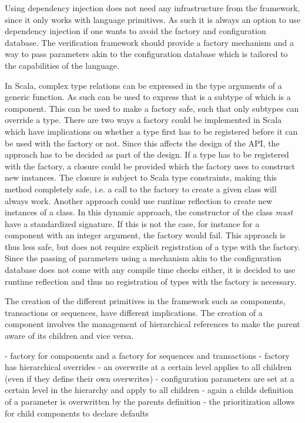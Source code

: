 Using dependency injection does not need any infrastructure from the framework, since it only works with language
primitives. As such it is always an option to use dependency injection if one wants to avoid the factory and
configuration database. The verification framework should provide a factory mechanism and a way to pass parameters
akin to the configuration database which is tailored to the capabilities of the language.

In Scala, complex type relations can be expressed in the type arguments of a generic function. As such \ttt{[T <:
Component, R <: T]} can be used to express that  is a subtype of  which is a component. This can be
used to make a factory safe, such that only subtypes can override a type. There are two ways a factory could be
implemented in Scala which have implications on whether a type first has to be registered before it can be used with
the factory or not. Since this affects the design of the API, the approach has to be decided as part of the design.
If a type has to be registered with the factory, a closure could be provided which the factory uses to construct new
instances. The closure is subject to Scala type constraints, making this method completely safe, i.e. a call to the
factory to create a given class will always work. Another approach could use runtime reflection to create new
instances of a class. In this dynamic approach, the constructor of the class \textit{must} have a standardized
signature. If this is not the case, for instance for a component with an integer argument, the factory would fail.
This approach is thus less safe, but does not require explicit registration of a type with the factory. Since the
passing of parameters using a mechanism akin to the configuration database does not come with any compile time checks
either, it is decided to use runtime reflection and thus no registration of types with the factory is necessary.

The creation of the different primitives in the framework such as components, transactions or sequences, have
different implications. The creation of a component involves the management of hierarchical references to make the
parent aware of its children and vice versa.

- factory for components and a factory for sequences and transactions
- factory has hierarchical overrides
- an overwrite at a certain level applies to all children (even if they define their own overwrites)
- configuration parameters are set at a certain level in the hierarchy and apply to all children
- again a childs definition of a parameter is overwritten by the parents definition
- the prioritization allows for child components to declare defaults

